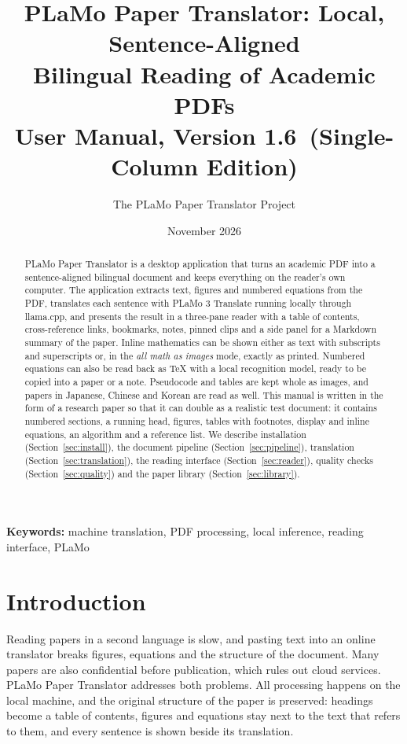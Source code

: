 \documentclass[11pt]{article}
\title{\textbf{PLaMo Paper Translator: Local, Sentence-Aligned\\Bilingual Reading of Academic PDFs}\\[4pt]
\large User Manual, Version 1.6\ifdefined\manualonecolumn\ (Single-Column Edition)\fi}
\author{The PLaMo Paper Translator Project}
\date{November 2026}
\begin{document}
\maketitle

\begin{abstract}
PLaMo Paper Translator is a desktop application that turns an academic PDF into a sentence-aligned bilingual document and keeps everything on the reader's own computer. The application extracts text, figures and numbered equations from the PDF, translates each sentence with PLaMo 3 Translate running locally through llama.cpp, and presents the result in a three-pane reader with a table of contents, cross-reference links, bookmarks, notes, pinned clips and a side panel for a Markdown summary of the paper. Inline mathematics can be shown either as text with subscripts and superscripts or, in the \emph{all math as images} mode, exactly as printed. Numbered equations can also be read back as \TeX{} with a local recognition model, ready to be copied into a paper or a note. Pseudocode and tables are kept whole as images, and papers in Japanese, Chinese and Korean are read as well. This manual is written in the form of a research paper so that it can double as a realistic test document: it contains numbered sections, a running head, figures, tables with footnotes, display and inline equations, an algorithm and a reference list. We describe installation (Section~\ref{sec:install}), the document pipeline (Section~\ref{sec:pipeline}), translation (Section~\ref{sec:translation}), the reading interface (Section~\ref{sec:reader}), quality checks (Section~\ref{sec:quality}) and the paper library (Section~\ref{sec:library}).
\end{abstract}

\noindent\textbf{Keywords:} machine translation, PDF processing, local inference, reading interface, PLaMo

\section{Introduction}
\label{sec:intro}
Reading papers in a second language is slow, and pasting text into an online translator breaks figures, equations and the structure of the document. Many papers are also confidential before publication, which rules out cloud services. PLaMo Paper Translator addresses both problems. All processing happens on the local machine, and the original structure of the paper is preserved: headings become a table of contents, figures and equations stay next to the text that refers to them, and every sentence is shown beside its translation.
\end{document}

